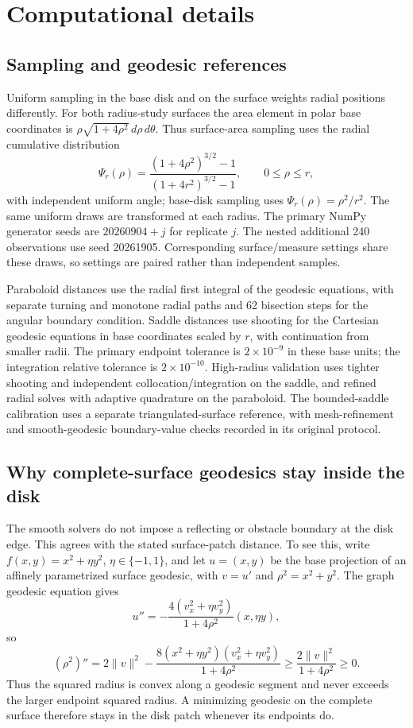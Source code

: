 \documentclass[11pt]{article}
\newcommand{\norm}[1]{\lVert#1\rVert}
\begin{document}
\clearpage
\appendix
\section{Computational details}\label{app:computation}
\subsection{Sampling and geodesic references}
Uniform sampling in the base disk and on the surface weights radial positions
differently. For both radius-study surfaces the area element in polar base coordinates is
$\rho\sqrt{1+4\rho^2}\,d\rho\,d\theta$. Thus surface-area sampling uses the
radial cumulative distribution
\[
 \Psi_r(\rho)=\frac{(1+4\rho^2)^{3/2}-1}{(1+4r^2)^{3/2}-1},
 \qquad 0\le\rho\le r,
\]
with independent uniform angle; base-disk sampling uses $\Psi_r(\rho)=\rho^2/r^2$.
The same uniform draws are transformed at each radius. The primary NumPy
generator seeds are $20260904+j$ for replicate $j$. The nested additional
240 observations use seed 20261905. Corresponding surface/measure settings
share these draws, so settings are paired rather than independent samples.

Paraboloid distances use the radial first integral of the geodesic equations,
with separate turning and monotone radial paths and 62 bisection steps for
the angular boundary condition. Saddle distances use shooting for the
Cartesian geodesic equations in base coordinates scaled by $r$, with
continuation from smaller radii. The primary endpoint tolerance is
$2\times10^{-9}$ in these base units; the integration relative tolerance is
$2\times10^{-10}$. High-radius validation uses tighter shooting and independent
collocation/integration on the saddle, and refined radial solves with adaptive
quadrature on the paraboloid. The bounded-saddle
calibration uses a separate triangulated-surface reference, with mesh-refinement
and smooth-geodesic boundary-value checks recorded in its original protocol.

\subsection{Why complete-surface geodesics stay inside the disk}
The smooth solvers do not impose a reflecting or obstacle boundary at the disk
edge. This agrees with the stated surface-patch distance. To see this, write
$f(x,y)=x^2+\eta y^2$, $\eta\in\{-1,1\}$, and let $u=(x,y)$ be the base
projection of an affinely parametrized surface geodesic, with $v=u'$ and
$\rho^2=x^2+y^2$. The graph geodesic equation gives
\[
 u''=-\frac{4(v_x^2+\eta v_y^2)}{1+4\rho^2}(x,\eta y),
\]
so
\[
 (\rho^2)''=2\norm v^2-
 \frac{8(x^2+\eta y^2)(v_x^2+\eta v_y^2)}{1+4\rho^2}
 \ge \frac{2\norm v^2}{1+4\rho^2}\ge0.
\]
Thus the squared radius is convex along a geodesic segment and never exceeds
the larger endpoint squared radius. A minimizing geodesic on the complete
surface therefore stays in the disk patch whenever its endpoints do.
\end{document}
